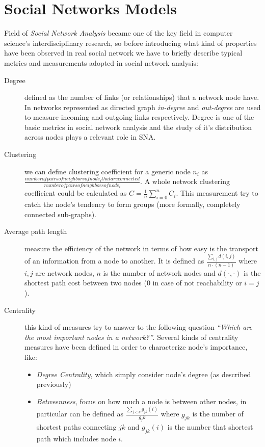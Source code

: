 \section{Social Networks Models}
\label{social_networks}

Field of \textit{Social Network Analysis} became one of the key field in computer science's interdisciplinary research, so before introducing what kind of properties have been observed in real social network we have to briefly describe typical metrics and measurements adopted in social network analysis:
\begin{description}
\item [Degree] defined as the number of links (or relationships) that a network node have\cite{newman:2010}. In networks represented as directed graph \emph{in-degree} and \emph{out-degree} are used to measure incoming and outgoing links respectively. Degree is one of the basic metrics in social network analysis and the study of it's distribution across nodes plays a relevant role in SNA.
\item [Clustering] we can define clustering coefficient for a generic node $n_{i}$ as $\frac{number of pairs of neighbors of node_{i} that are connected}{number of pairs of neighbors of node_{i}}$. A whole network clustering coefficient could be calculated as $C=\frac{1}{n} \sum_{i=0}^{n} C_{i}$\cite{citeulike:1580006}. This measurement try to catch the node's tendency to form groups (more formally, completely connected sub-graphs).
\item [Average path length] measure the efficiency of the network in terms of how easy is the transport of an information from a node to another. It is defined as $\frac{\sum_{i,j}{d(i,j)}}{n\cdot (n-1)}$ where $i,j$ are network nodes, $n$ is the number of network nodes and $d(\cdot,\cdot)$ is the shortest path cost between two nodes ($0$ in case of not reachability or $i=j$). 
\item [Centrality] this kind of measures try to answer to the following question \textit{``Which are the most important nodes in a network?''}. Several kinds of centrality measures have been defined in order to characterize node's importance, like:
\begin{itemize}
\item \emph{Degree Centrality}, which simply consider node's degree (as described previously)
\item \emph{Betweenness}, focus on how much a node is between other nodes, in particular can be defined as $ \frac{\sum_{j<k}{g_{jk}(i)}}{g_jk }$ where $g_{jk}$ is the number of shortest paths connecting $jk$ and $g_{jk}(i)$ is the number that shortest path which includes node $i$.

\end{itemize}
\end{description}
